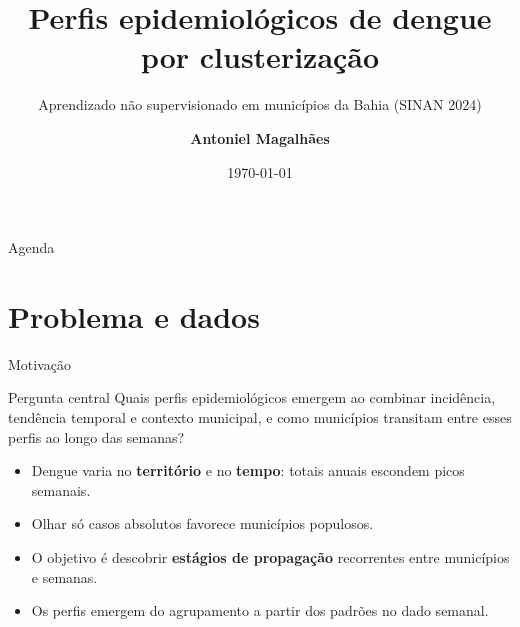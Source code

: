 \documentclass[aspectratio=169,xcolor=table]{beamer}
\author[Antoniel Magalh\~aes]{\textbf{Antoniel Magalh\~aes}}
\title{Perfis epidemiol\'ogicos de dengue por clusteriza\c{c}\~ao}
\subtitle{Aprendizado n\~ao supervisionado em munic\'ipios da Bahia (SINAN 2024)}
\institute{Intelig\^encia Artificial IV}
\date{\today}
\begin{document}
\begin{frame}
    \titlepage
\end{frame}

\begin{frame}{Agenda}
    \tableofcontents
\end{frame}

\section{Problema e dados}
\sectionframe

\begin{frame}{Motiva\c{c}\~ao}
    \begin{block}{Pergunta central}
        Quais perfis epidemiol\'ogicos emergem ao combinar incid\^encia, tend\^encia temporal e contexto municipal, e como munic\'ipios transitam entre esses perfis ao longo das semanas?
    \end{block}

    \begin{itemize}
        \item Dengue varia no \textbf{territ\'orio} e no \textbf{tempo}: totais anuais escondem picos semanais.
        \item Olhar s\'o casos absolutos favorece munic\'ipios populosos.
        \item O objetivo \'e descobrir \textbf{est\'agios de propaga\c{c}\~ao} recorrentes entre munic\'ipios e semanas.
        \item Os perfis emergem do agrupamento a partir dos padr\~oes no dado semanal.
    \end{itemize}
\end{frame}
\end{document}
